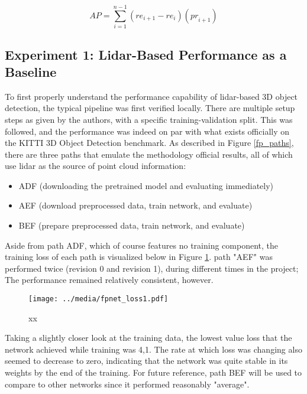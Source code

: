 \begin{equation}
AP = \sum^{n-1}_{i=1} ({re}_{i+1}-{re}_{i})({pr}_{i+1})
\label{eq_ap}
\end{equation}

\subsection{Experiment 1: Lidar-Based Performance as a Baseline}

To first properly understand the performance capability of lidar-based 3D object detection, the typical pipeline was first verified locally. There are multiple setup steps as given by the authors, with a specific training-validation split. This was followed, and the performance was indeed on par with what exists officially on the KITTI 3D Object Detection benchmark. As described in Figure \ref{fp_paths}, there are three paths that emulate the methodology official results, all of which use lidar as the source of point cloud information: 

\begin{itemize} \itemsep=-0.5em
	\item ADF (downloading the pretrained model and evaluating immediately)
	\item AEF (download preprocessed data, train network, and evaluate)
	\item BEF (prepare preprocessed data, train network, and evaluate)
\end{itemize}

Aside from path ADF, which of course features no training component, the training loss of each path is visualized below in Figure \ref{fpnet_loss1}. path "AEF" was performed twice (revision 0 and revision 1), during different times in the project; The performance remained relatively consistent, however.

\begin{figure}[H]
	\centering
	\texttt{[image: ../media/fpnet\_loss1.pdf]}
	\caption{xx}
	\label{fpnet_loss1}
\end{figure}

Taking a slightly closer look at the training data, the lowest value loss that the network achieved while training was 4,1. The rate at which loss was changing also seemed to decrease to zero, indicating that the network was quite stable in its weights by the end of the training. For future reference, path BEF will be used to compare to other networks since it performed reasonably "average".

